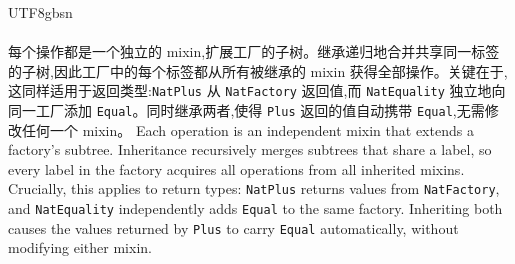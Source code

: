 \begin{CJK*}{UTF8}{gbsn}
\paragraph{}
\label{sec:discussion-tree-level-inheritance}
\ifPaperChinese
每个操作都是一个独立的 mixin,扩展工厂的子树。继承递归地合并共享同一标签的子树,因此工厂中的每个标签都从所有被继承的 mixin 获得全部操作。关键在于,这同样适用于返回类型:\texttt{NatPlus} 从 \texttt{NatFactory} 返回值,而 \texttt{NatEquality} 独立地向同一工厂添加 \texttt{Equal}。同时继承两者,使得 \texttt{Plus} 返回的值自动携带 \texttt{Equal},无需修改任何一个 mixin。
\else
Each operation is an independent mixin that extends a factory's
subtree.
Inheritance recursively merges subtrees that share a label,
so every label in the factory acquires all operations from all
inherited mixins.
Crucially, this applies to return types: \texttt{NatPlus} returns
values from \texttt{NatFactory}, and \texttt{NatEquality}
independently adds \texttt{Equal} to the same factory.
Inheriting both causes the values returned by \texttt{Plus} to
carry \texttt{Equal} automatically, without modifying either mixin.
\fi


\end{CJK*}
